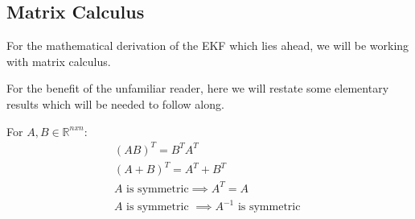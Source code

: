 \subsection{Matrix Calculus}
For the mathematical derivation of the EKF which lies ahead, we will be working with matrix calculus.

For the benefit of the unfamiliar reader, here we will restate some elementary results which will be needed to follow along.

For \(A,B \in \mathbb{R}^{nxn}\):
\begin{gather}
(AB)^T = B^T A^T \\
(A+B)^T = A^T + B^T \\
A \text{ is symmetric} \implies A^T = A \\
A \text{ is symmetric } \implies A^{-1} \text{ is symmetric } 
\end{gather}

